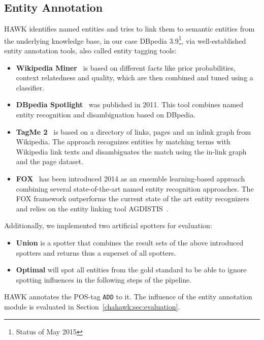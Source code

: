 \subsection{Entity Annotation}
HAWK identifies named entities and tries to link them to semantic entities from the underlying knowledge base, in our case DBpedia 3.9\footnote{Status of May 2015}, via well-established entity annotation tools, also called entity tagging tools:
\begin{itemize}
\item \textbf{Wikipedia Miner}~\cite{milne2008learning} is based on different facts like prior probabilities, context relatedness and quality, which are then combined and tuned using a classifier.
\item \textbf{DBpedia Spotlight}~\cite{spotlight} %
was published in 2011. 
This tool combines named entity recognition and disambiguation based on DBpedia.
\item \textbf{TagMe 2}~\cite{TagMe2} is based on a directory of links, pages and an inlink graph from Wikipedia.
The approach recognizes entities by matching terms with Wikipedia link texts and disambiguates the match using the in-link graph and the page dataset.
\item \textbf{FOX}~\cite{FOX} has been introduced 2014 as an ensemble learning-based approach combining several state-of-the-art named entity recognition approaches. 
The FOX framework outperforms the current state of the art entity recognizers and relies on the entity linking tool AGDISTIS~\cite{agdistis_iswc}.
\end{itemize}
Additionally, we implemented two artificial spotters for evaluation:
\begin{itemize}
\item \textbf{Union} is a spotter that combines the result sets of the above introduced spotters and returns thus a superset of all spotters.
\item \textbf{Optimal} will spot all entities from the gold standard to be able to ignore spotting influences in the following steps of the pipeline.
\end{itemize}

HAWK annotates the POS-tag \texttt{ADD} to it. %
The influence of the entity annotation module is evaluated in Section~\ref{chahawk:sec:evaluation}.

